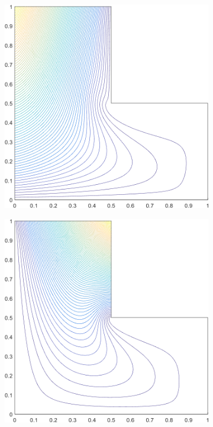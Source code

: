 \begin{figure}
\label{fig::2D_MAXENT1_Ldom_basis_functions}
\centering
	\begin{subfigure}[b]{0.39\textwidth}
		\centering
		\includegraphics[width=\textwidth]{figures/sec_BF/L-domain_MAXENT1_contour_b6.png}
		\caption{}
	\end{subfigure}
	\hspace{1.5cm}
	\begin{subfigure}[b]{0.39\textwidth}
		\centering
		\includegraphics[width=\textwidth]{figures/sec_BF/L-domain_MAXENT1_contour_b5.png}

\end{subfigure}
\end{figure}
